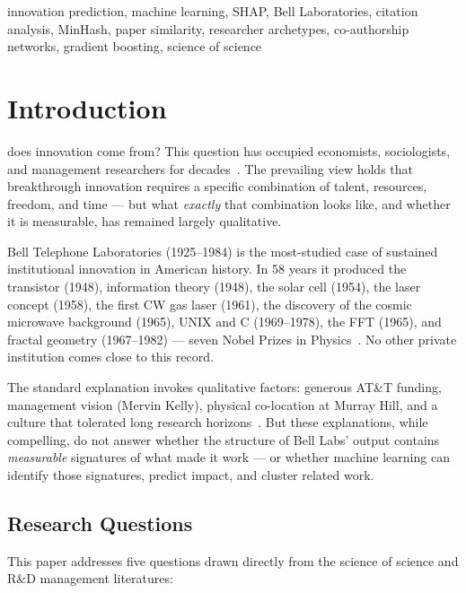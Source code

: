 \documentclass[journal]{IEEEtran}
\begin{document}
\begin{IEEEkeywords}
innovation prediction, machine learning, SHAP, Bell Laboratories, citation
analysis, MinHash, paper similarity, researcher archetypes, co-authorship
networks, gradient boosting, science of science
\end{IEEEkeywords}


\section{Introduction}
 does innovation come from? This question has occupied
economists, sociologists, and management researchers for decades~\cite{Nelson1959,
Fortunato2018}. The prevailing view holds that breakthrough innovation requires
a specific combination of talent, resources, freedom, and time --- but what
\textit{exactly} that combination looks like, and whether it is measurable, has
remained largely qualitative.

Bell Telephone Laboratories (1925--1984) is the most-studied case of sustained
institutional innovation in American history. In 58 years it produced the
transistor (1948), information theory (1948), the solar cell (1954), the laser
concept (1958), the first CW gas laser (1961), the discovery of the cosmic
microwave background (1965), UNIX and C (1969--1978), the FFT (1965), and
fractal geometry (1967--1982) --- seven Nobel Prizes in Physics~\cite{Gertner2012}.
No other private institution comes close to this record.

The standard explanation invokes qualitative factors: generous AT\&T funding,
management vision (Mervin Kelly), physical co-location at Murray Hill, and a
culture that tolerated long research horizons~\cite{Mowery2009}. But these
explanations, while compelling, do not answer whether the structure of Bell
Labs' output contains \textit{measurable} signatures of what made it work ---
or whether machine learning can identify those signatures, predict impact,
and cluster related work.

\subsection{Research Questions}

This paper addresses five questions drawn directly from the science of science
and R\&D management literatures:
\end{document}
